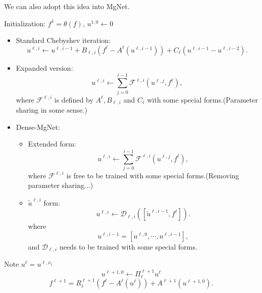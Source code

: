 We can also adopt this idea into MgNet.
\begin{breakablealgorithm}
	\caption{$u^{J}={\rm Dense-MgNet}(f; J,\nu_1, \cdots, \nu_J)$}
	\label{alg:dense-mgnet}
	\begin{algorithmic}
		\State Initialization:  $f^1 =\theta(f)$, $u^{1,0} \leftarrow 0$
		\State 
		\begin{itemize}
			\item Standard Chebyshev iteration:
			\begin{equation}\label{chebyshev-mgnet}
			u^{\ell,i} \leftarrow u^{\ell,i-1} + B_{\ell,i}  ({f^\ell -  A^{\ell} (u^{\ell,i-1})}) + C_{\ell}(u^{\ell,i-1} - u^{\ell,i-2}).
			\end{equation}
			\item Expanded version: 
			\begin{equation}\label{expanded-mgnet}
			u^{\ell,i} \leftarrow \sum_{j=0}^{i-1} \mathcal F^{\ell,i}(u^{\ell,j}, f^\ell),
			\end{equation}
			where $\mathcal F^{\ell,i}$ is defined by $A^\ell, B_{\ell,i}$ and $C_\ell$ with some special forms.(Parameter sharing in some sense.)
			\item Dense-MgNet:
			\begin{itemize}
				\item Extended form:
				\begin{equation}\label{extendes-mgnet}
				u^{\ell,i} \leftarrow \sum_{j=0}^{i-1} \mathcal F^{\ell,i}(u^{\ell,j}, f^\ell),
				\end{equation}
				where $\mathcal F^{\ell,i}$ is free to be trained with some special forms.(Removing parameter sharing...)
				\item $\tilde u^{\ell,i}$ form:
				\begin{equation}\label{dense-mgnet}
				u^{\ell,i} \leftarrow \mathcal D_{\ell,i}([\tilde u^{\ell,i-1}, f^{\ell}]).
				\end{equation}
				where 
				\begin{equation}\label{eq:tilde-u}
				u^{\ell,i-1} = [u^{\ell,0}, \cdots, u^{\ell,i-1}],
				\end{equation}
				and $\mathcal D_{\ell,i}$ needs to be trained with some special forms.
			\end{itemize}
		
		\end{itemize}
		
		\EndFor
		\State Note $u^\ell = u^{\ell,\nu_\ell}$
		\begin{equation}
		\label{d-interpolation}
		u^{\ell+1,0} \leftarrow \Pi_\ell^{\ell+1}u^{\ell}
		\end{equation}
		\begin{equation}
		\label{d-restrict-f}
		f^{\ell+1} = R^{\ell+1}_\ell(f^\ell - A^\ell(u^{\ell})) + A^{\ell+1} (u^{\ell+1,0}).
		\end{equation}
		\EndFor
	\end{algorithmic}
\end{breakablealgorithm}



